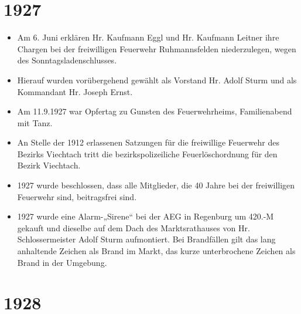 \documentclass[12pt,a4paper]{book}
\begin{document}
\section*{1927}

\begin{itemize}
\item Am 6. Juni erklären Hr. Kaufmann Eggl und Hr. Kaufmann Leitner ihre
Chargen bei der freiwilligen Feuerwehr Ruhmannsfelden niederzulegen, wegen des
Sonntagsladenschlusses.

\item Hierauf wurden vorübergehend gewählt als Vorstand Hr. Adolf Sturm und als
Kommandant Hr. Joseph Ernst.

\item Am 11.9.1927 war Opfertag zu Gunsten des Feuerwehrheims, Familienabend mit
Tanz.

\item An Stelle der 1912 erlassenen Satzungen für die freiwillige Feuerwehr des
Bezirks Viechtach tritt die bezirkspolizeiliche Feuerlöschordnung für den Bezirk
Viechtach.

\item 1927 wurde beschlossen, dass alle Mitglieder, die 40 Jahre bei der
freiwilligen Feuerwehr sind, beitragsfrei sind.

\item 1927 wurde eine Alarm-„Sirene“ bei der AEG in Regenburg um 420.-M gekauft
und dieselbe auf dem Dach des Marktsrathauses von Hr. Schlossermeister Adolf
Sturm aufmontiert. Bei Brandfällen gilt das lang anhaltende Zeichen als Brand im
Markt, das kurze unterbrochene Zeichen als Brand in der Umgebung.
\end{itemize}

\section*{1928}
\end{document}
